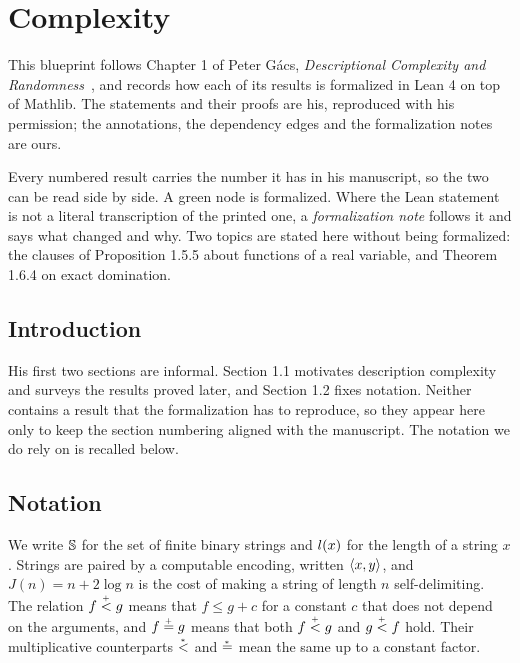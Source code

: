 %
%

\chapter{Complexity}

This blueprint follows Chapter 1 of Peter G\'acs, \emph{Descriptional Complexity and
Randomness}~\cite{Gacs2021}, and records how each of its results is formalized in Lean 4
on top of Mathlib. The statements and their proofs are his, reproduced with his
permission; the annotations, the dependency edges and the formalization notes are ours.

Every numbered result carries the number it has in his manuscript, so the two can be read
side by side. A green node is formalized. Where the Lean statement is not a literal
transcription of the printed one, a \emph{formalization note} follows it and says what
changed and why. Two topics are stated here without being formalized: the clauses of
Proposition 1.5.5 about functions of a real variable, and Theorem 1.6.4 on exact
domination.

\section{Introduction}

His first two sections are informal. Section 1.1 motivates description complexity and
surveys the results proved later, and Section 1.2 fixes notation. Neither contains a
result that the formalization has to reproduce, so they appear here only to keep the
section numbering aligned with the manuscript. The notation we do rely on is recalled
below.

\section{Notation }

We write $\mathbb{S}$ for the set of finite binary strings and $l(x)$ for the length of a
string $x$. Strings are paired by a computable encoding, written ${\mathopen\langle x,y\mathclose\rangle}$, and
$J(n) = n + 2\log n$ is the cost of making a string of length $n$ self-delimiting. The
relation $f \stackrel{{}_+}{<} g$ means that $f \le g + c$ for a constant $c$ that does not depend on
the arguments, and $f \stackrel{{}_+}{=} g$ means that both $f \stackrel{{}_+}{<} g$ and $g \stackrel{{}_+}{<} f$ hold. Their
multiplicative counterparts $\stackrel{{}_*}{<}$ and $\stackrel{{}_*}{=}$ mean the same up to a constant factor.

